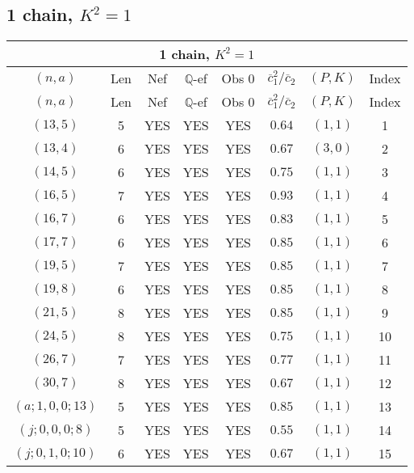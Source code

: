 \subsection{1 chain, $K^2 = 1$}
\begin{longtable}{|c|c|c|c|c|c|c|c|}
\hline
\multicolumn{8}{|c|}{1 chain, $K^2 = 1$}\\
\hline
$(n,a)$ & Len & Nef & $\mathbb Q$-ef & Obs 0 & $\overline c_1^2 / \overline c_2$ & $(P,K)$ & Index\\
\hline
\endfirsthead

\hline
$(n,a)$ & Len & Nef & $\mathbb Q$-ef & Obs 0 & $\overline c_1^2 / \overline c_2$ & $(P,K)$ & Index\\
\hline
\endhead
\hline
\endfoot

$(13,5)$ & 5 & YES & YES & YES & $0.64$ & $(1,1)$ & 1\\
$(13,4)$ & 6 & YES & YES & YES & $0.67$ & $(3,0)$ & 2\\
$(14,5)$ & 6 & YES & YES & YES & $0.75$ & $(1,1)$ & 3\\
$(16,5)$ & 7 & YES & YES & YES & $0.93$ & $(1,1)$ & 4\\
$(16,7)$ & 6 & YES & YES & YES & $0.83$ & $(1,1)$ & 5\\
$(17,7)$ & 6 & YES & YES & YES & $0.85$ & $(1,1)$ & 6\\
$(19,5)$ & 7 & YES & YES & YES & $0.85$ & $(1,1)$ & 7\\
$(19,8)$ & 6 & YES & YES & YES & $0.85$ & $(1,1)$ & 8\\
$(21,5)$ & 8 & YES & YES & YES & $0.85$ & $(1,1)$ & 9\\
$(24,5)$ & 8 & YES & YES & YES & $0.75$ & $(1,1)$ & 10\\
$(26,7)$ & 7 & YES & YES & YES & $0.77$ & $(1,1)$ & 11\\
$(30,7)$ & 8 & YES & YES & YES & $0.67$ & $(1,1)$ & 12\\
$(a;1,0,0;13)$ & 5 & YES & YES & YES & $0.85$ & $(1,1)$ & 13\\
$(j;0,0,0;8)$ & 5 & YES & YES & YES & $0.55$ & $(1,1)$ & 14\\
$(j;0,1,0;10)$ & 6 & YES & YES & YES & $0.67$ & $(1,1)$ & 15
\end{longtable}
